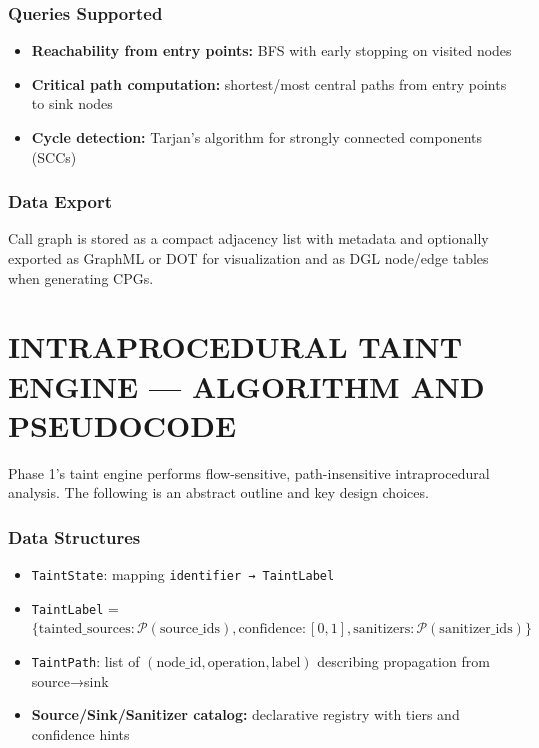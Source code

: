 \subsubsection{Queries Supported}

\begin{itemize}
    \item \textbf{Reachability from entry points:} BFS with early stopping on visited nodes
    \item \textbf{Critical path computation:} shortest/most central paths from entry points to sink nodes
    \item \textbf{Cycle detection:} Tarjan's algorithm for strongly connected components (SCCs)
\end{itemize}

\subsubsection{Data Export}

Call graph is stored as a compact adjacency list with metadata and optionally exported as GraphML or DOT for visualization and as DGL node/edge tables when generating CPGs.

\section{\uppercase{Intraprocedural Taint Engine --- Algorithm and Pseudocode}}

Phase 1's taint engine performs flow-sensitive, path-insensitive intraprocedural analysis. The following is an abstract outline and key design choices.

\subsubsection{Data Structures}

\begin{itemize}
    \item \texttt{TaintState}: mapping \texttt{identifier → TaintLabel}
    \item \texttt{TaintLabel} = $\{\text{tainted\_sources}: \mathcal{P}(\text{source\_ids}), \text{confidence}: [0,1], \text{sanitizers}: \mathcal{P}(\text{sanitizer\_ids})\}$
    \item \texttt{TaintPath}: list of $(\text{node\_id}, \text{operation}, \text{label})$ describing propagation from source→sink
    \item \textbf{Source/Sink/Sanitizer catalog:} declarative registry with tiers and confidence hints
\end{itemize}

